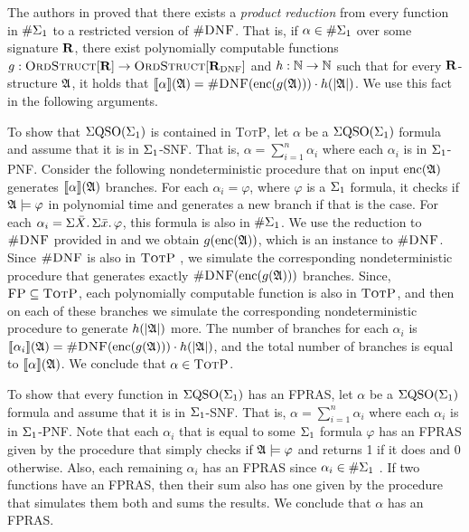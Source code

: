 
The authors in \cite{SalujaST95} proved that there exists a {\em product reduction} from every function in $\#\Sigma_{1}$ to a restricted version of $\textsc{\#DNF}$. 
That is, if $\alpha\in\#\Sigma_{1}$ over some signature $\mathbf{R}$, there exist polynomially computable functions $g:\text{\sc OrdStruct}[\mathbf{R}]\to\text{\sc OrdStruct}[\mathbf{R}_{\text{DNF}}]$ and $h:\mathbb{N}\to\mathbb{N}$ such that for every $\mathbf{R}$-structure $\mathfrak{A}$, it holds that ${\llbracket{}{\alpha}\rrbracket}(\mathfrak{A}) = \textsc{\#DNF}({\rm enc}(g(\mathfrak{A})))\cdot h(\vert \mathfrak{A} \vert)$. We use this fact in the following arguments. 

To show that $\Sigma{\rm QSO}(\Sigma_{1})$ is contained  in \textsc{TotP}, let $\alpha$ be a $\Sigma{\rm QSO}(\Sigma_{1})$ formula and assume that it is in $\Sigma_{1}$-SNF. 
That is, $\alpha = \sum_{i = 1}^n\alpha_i$ where each $\alpha_i$ is in $\Sigma_{1}$-PNF. 
Consider the following nondeterministic procedure that on input ${\rm enc}(\mathfrak{A})$ generates ${\llbracket{}{\alpha}\rrbracket}(\mathfrak{A})$ branches. 
For each $\alpha_i = \varphi$, where $\varphi$ is a $\Sigma_{1}$ formula, it checks if $\mathfrak{A}\models\varphi$ in polynomial time and generates a new branch if that is the case. 
For each $\alpha_i = \Sigma{\bar{X}}.\,\Sigma{\bar{x}}.\,\varphi$, this formula is also in $\#\Sigma_{1}$. 
We use the reduction to $\textsc{\#DNF}$ provided in \cite{SalujaST95} and we obtain $g({\rm enc}(\mathfrak{A}))$, which is an instance to $\textsc{\#DNF}$. 
Since $\textsc{\#DNF}$ is also in $\text{\sc TotP}$ \cite{PagourtzisZ06}, we simulate the corresponding nondeterministic procedure that generates exactly $\textsc{\#DNF}({\rm enc}(g(\mathfrak{A})))$ branches. 
Since, $\text{\sc FP}\subseteq\text{\sc TotP}$\cite{PagourtzisZ06}, each polynomially computable function is also in $\text{\sc TotP}$, and then on each of these branches we simulate the corresponding nondeterministic procedure to generate $h(\vert \mathfrak{A} \vert)$ more. 
The number of branches for each $\alpha_i$ is ${\llbracket{}{\alpha_i}\rrbracket}(\mathfrak{A}) = \textsc{\#DNF}({\rm enc}(g(\mathfrak{A})))\cdot h(\vert \mathfrak{A} \vert)$, and the total number of branches is equal to ${\llbracket{}{\alpha}\rrbracket}(\mathfrak{A})$. 
We conclude that $\alpha\in\text{\sc TotP}$.

To show that every function in $\Sigma{\rm QSO}(\Sigma_{1})$ has an FPRAS,  let $\alpha$ be a $\Sigma{\rm QSO}(\Sigma_{1})$ formula and assume that it is in $\Sigma_{1}$-SNF. 
That is, $\alpha = \sum_{i = 1}^n\alpha_i$ where each $\alpha_i$ is in $\Sigma_{1}$-PNF. 
Note that each $\alpha_i$ that is equal to some $\Sigma_{1}$ formula $\varphi$ has an FPRAS given by the procedure that simply checks if $\mathfrak{A}\models\varphi$ and returns 1 if it does and 0 otherwise. 
Also, each remaining $\alpha_i$ has an FPRAS since $\alpha_i\in \#\Sigma_{1}$ \cite{SalujaST95}. 
If two functions have an FPRAS, then their sum also has one given by the procedure that simulates them both and sums the results. 
We conclude that $\alpha$ has an FPRAS.

